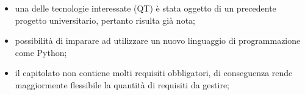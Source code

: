 \begin{itemize}
\item una delle tecnologie interessate (QT) è stata oggetto di un precedente progetto universitario, pertanto risulta già nota;
\item possibilità di imparare ad utilizzare un nuovo linguaggio di programmazione come Python;
\item il capitolato non contiene molti requisiti obbligatori, di conseguenza rende maggiormente flessibile la quantità di requisiti da gestire;
\end{itemize}
